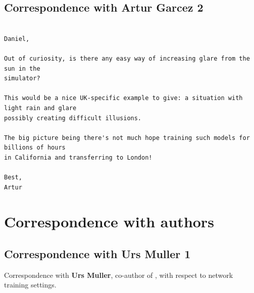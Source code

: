 \subsection{Correspondence with Artur Garcez 2}
\label{met:corr_arthur_2}
\begin{verbatim}

Daniel,

Out of curiosity, is there any easy way of increasing glare from the sun in the 
simulator?

This would be a nice UK-specific example to give: a situation with light rain and glare 
possibly creating difficult illusions.

The big picture being there's not much hope training such models for billions of hours 
in California and transferring to London!

Best,
Artur    
\end{verbatim}

\section{Correspondence with authors}
\label{corr_with_authors}

\subsection{Correspondence with Urs Muller 1}
\label{urs_muller1}
Correspondence with \textbf{Urs Muller}, co-author of \cite{bojarski2016end}, with respect to network training settings.

